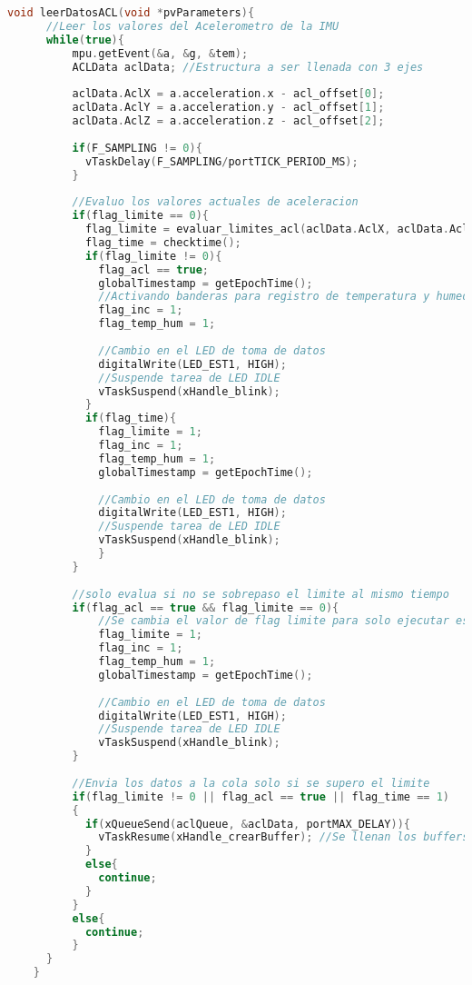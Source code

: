 \begin{lstlisting}[language=C++, caption=Tarea de lectura de datos de aceleración triaxial]
  void leerDatosACL(void *pvParameters){
      //Leer los valores del Acelerometro de la IMU
      while(true){
          mpu.getEvent(&a, &g, &tem);
          ACLData aclData; //Estructura a ser llenada con 3 ejes
    
          aclData.AclX = a.acceleration.x - acl_offset[0];
          aclData.AclY = a.acceleration.y - acl_offset[1]; 
          aclData.AclZ = a.acceleration.z - acl_offset[2];
    
          if(F_SAMPLING != 0){
            vTaskDelay(F_SAMPLING/portTICK_PERIOD_MS);
          }
          
          //Evaluo los valores actuales de aceleracion
          if(flag_limite == 0){
            flag_limite = evaluar_limites_acl(aclData.AclX, aclData.AclY, aclData.AclZ);
            flag_time = checktime();
            if(flag_limite != 0){
              flag_acl == true;
              globalTimestamp = getEpochTime();
              //Activando banderas para registro de temperatura y humedad
              flag_inc = 1;
              flag_temp_hum = 1;
    
              //Cambio en el LED de toma de datos
              digitalWrite(LED_EST1, HIGH);
              //Suspende tarea de LED IDLE
              vTaskSuspend(xHandle_blink);
            }
            if(flag_time){
              flag_limite = 1;
              flag_inc = 1;
              flag_temp_hum = 1;
              globalTimestamp = getEpochTime();
    
              //Cambio en el LED de toma de datos
              digitalWrite(LED_EST1, HIGH);
              //Suspende tarea de LED IDLE
              vTaskSuspend(xHandle_blink);
              }
          }
    
          //solo evalua si no se sobrepaso el limite al mismo tiempo
          if(flag_acl == true && flag_limite == 0){
              //Se cambia el valor de flag limite para solo ejecutar esto 1 vez
              flag_limite = 1;
              flag_inc = 1;
              flag_temp_hum = 1;
              globalTimestamp = getEpochTime();
    
              //Cambio en el LED de toma de datos
              digitalWrite(LED_EST1, HIGH);
              //Suspende tarea de LED IDLE
              vTaskSuspend(xHandle_blink);
          }
    
          //Envia los datos a la cola solo si se supero el limite
          if(flag_limite != 0 || flag_acl == true || flag_time == 1)
          {
            if(xQueueSend(aclQueue, &aclData, portMAX_DELAY)){
              vTaskResume(xHandle_crearBuffer); //Se llenan los buffers para enviar los datos
            }
            else{
              continue;
            }
          }
          else{
            continue;
          }
      }
    }
    
\end{lstlisting}

